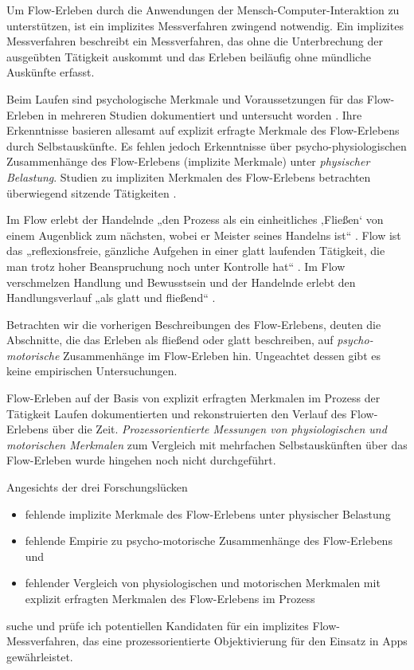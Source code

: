 \label{sec:gegenstand_problemstellung_und_ziele}

Um Flow-Erleben durch die Anwendungen der Mensch-Computer-Interaktion zu unterstützen, ist ein implizites Messverfahren zwingend notwendig. Ein implizites Messverfahren beschreibt ein Messverfahren, das ohne die Unterbrechung der ausgeübten Tätigkeit auskommt und das Erleben beiläufig ohne mündliche Auskünfte erfasst.

Beim Laufen sind psychologische Merkmale und Voraussetzungen für das Flow-Erleben in mehreren Studien dokumentiert und untersucht worden \citep{Stoll2005, Reinhardt2006, Schuler2009, Jimenez-Torres2013}. Ihre Erkenntnisse basieren allesamt auf explizit erfragte Merkmale des Flow-Erlebens durch Selbstauskünfte. Es fehlen jedoch Erkenntnisse über psycho-physiologischen Zusammenhänge des Flow-Erlebens (implizite Merkmale) unter \emph{physischer Belastung}. Studien zu impliziten Merkmalen des Flow-Erlebens betrachten überwiegend sitzende Tätigkeiten \citep{deManzano2010, Keller2011, Peifer2014, Tozman2015, Harmat2015}. 

Im Flow erlebt der Handelnde „den Prozess als ein einheitliches ‚Fließen‘ von einem Augenblick zum nächsten, wobei er Meister seines Handelns ist“ \citep[][S.~59]{Csikszentmihalyi2010}. Flow ist das „reflexionsfreie, gänzliche Aufgehen in einer glatt laufenden Tätigkeit, die man trotz hoher Beanspruchung noch unter Kontrolle hat“ \citep[][S.~156]{Rheinberg2003}. Im Flow verschmelzen Handlung und Bewusstsein und der Handelnde erlebt den Handlungsverlauf „als glatt und fließend“ \citep[][S.~13]{Henk2014}.

Betrachten wir die vorherigen Beschreibungen des Flow-Erlebens, deuten die Abschnitte, die das Erleben als fließend oder glatt beschreiben, auf \emph{psycho-motorische} Zusammenhänge im Flow-Erleben hin. Ungeachtet dessen gibt es keine empirischen Untersuchungen.

Flow-Erleben auf der Basis von explizit erfragten Merkmalen im Prozess der Tätigkeit Laufen dokumentierten \citet{Reinhardt2006, Schuler2009} und rekonstruierten den Verlauf des Flow-Erlebens über die Zeit. \emph{Prozessorientierte Messungen von physiologischen und motorischen Merkmalen} zum Vergleich mit mehrfachen Selbstauskünften über das Flow-Erleben wurde hingehen noch nicht durchgeführt.

Angesichts der drei Forschungslücken 
\begin{itemize}
	
	\item fehlende implizite Merkmale des Flow-Erlebens unter physischer Belastung
	
	\item fehlende Empirie zu psycho-motorische Zusammenhänge des Flow-Erlebens und
	
	\item fehlender Vergleich von physiologischen und motorischen Merkmalen mit explizit erfragten Merkmalen des Flow-Erlebens im Prozess 
\end{itemize}
suche und prüfe ich potentiellen Kandidaten für ein implizites Flow-Messverfahren, das eine prozessorientierte Objektivierung für den Einsatz in Apps gewährleistet. 

